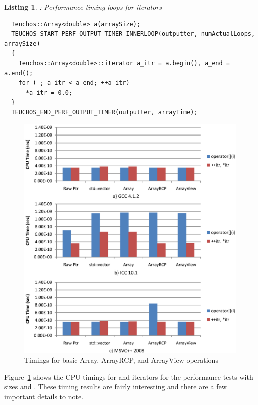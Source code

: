 \documentclass[pdf,ps2pdf,11pt]{SANDreport}
\newtheorem{listing}{Listing}
\begin{document}
\begin{listing}: Performance timing loops for {} iterators \\
\label{listing:Array-iterator-timing}
{\small\begin{verbatim}
  Teuchos::Array<double> a(arraySize); 
  TEUCHOS_START_PERF_OUTPUT_TIMER_INNERLOOP(outputter, numActualLoops, arraySize) 
  { 
    Teuchos::Array<double>::iterator a_itr = a.begin(), a_end = a.end(); 
    for ( ; a_itr < a_end; ++a_itr) 
      *a_itr = 0.0; 
  }
  TEUCHOS_END_PERF_OUTPUT_TIMER(outputter, arrayTime); 
\end{verbatim}}
\end{listing}


{\bsinglespace
\begin{figure}
\begin{center}
\includegraphics*[angle=0,scale=1.00]{ArrayTimings}
\end{center}
\caption{
\label{fig:ArrayTimings}
Timings for basic Array, ArrayRCP, and ArrayView operations}
\end{figure}
\esinglespace}


Figure~\ref{fig:ArrayTimings} shows the CPU timings for
{} and iterators for the performance tests
with sizes {} and {}.
These timing results are fairly interesting and there are a few
important details to note.
\end{document}
